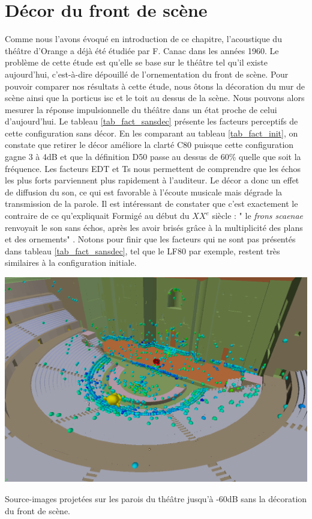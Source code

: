 \section{Décor du front de scène}

Comme nous l'avons évoqué en introduction de ce chapitre, l'acoustique du théâtre d'Orange a déjà été étudiée par F. Canac dans les années 1960. Le problème de cette étude est qu'elle se base sur le théâtre tel qu'il existe aujourd'hui, c'est-à-dire dépouillé de l'ornementation du front de scène. Pour pouvoir comparer nos résultats à cette étude, nous ôtons la décoration du mur de scène ainsi que la \gls{porticus isc} et le toit au dessus de la scène. Nous pouvons alors mesurer la réponse impulsionnelle du théâtre dans un état proche de celui d'aujourd'hui. Le tableau \ref{tab_fact_sansdec} présente les facteurs perceptifs de cette configuration sans décor. En les comparant au tableau \ref{tab_fact_init}, on constate que retirer le décor améliore la clarté \gls{C80} puisque cette configuration gagne 3 à 4dB et que la définition \gls{D50} passe au dessus de 60\% quelle que soit la fréquence. Les facteurs \gls{EDT} et \gls{Ts} nous permettent de comprendre que les échos les plus forts parviennent plus rapidement à l'auditeur. Le décor a donc un effet de diffusion du son, ce qui est favorable à l'écoute musicale mais dégrade la transmission de la parole. Il est intéressant de constater que c'est exactement le contraire de ce qu'expliquait Formigé au début du $XX^e$ siècle : " le \textit{frons scaenae} renvoyait le son sans échos, après les avoir brisés grâce à la multiplicité des plans et des ornements" \cite[p.43]{formige}. Notons pour finir que les facteurs qui ne sont pas présentés dans tableau \ref{tab_fact_sansdec}, tel que le \gls{LF80} par exemple, restent très similaires à la configuration initiale.%


\begin{figureth}
	\includegraphics[width=\linewidth]{images/SIsansDec}
	\caption{Source-images projetées sur les parois du théâtre jusqu'à -60dB sans la décoration du front de scène.}
	\label{SIsansDec}
\end{figureth}

